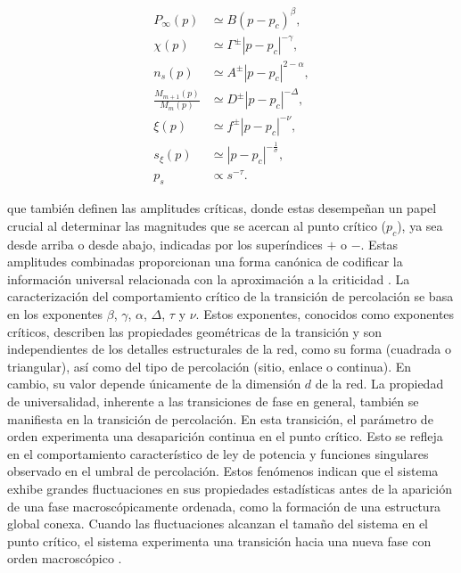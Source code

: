 \begin{align} 
	P_\infty(p) & \simeq B\left(p-p_c\right)^\beta, \label{eq:6a}\\ 
	\chi(p)  & \simeq \Gamma^{\pm}\left| p-p_c \right|^{-\gamma}, \label{eq:6b} \\
	n_s(p) & \simeq A^{\pm}  \left| p-p_c \right|^{2-\alpha}, \label{eq:6c} \\
	\frac{M_{m+1}(p)}{M_m(p)} &\simeq D^{\pm} \left| p-p_c \right|^{-\Delta}, \label{eq:6d}\\
	\xi(p) &\simeq f^{\pm}\left| p-p_c \right|^{-\nu}, \label{eq:6e} \\
	s_\xi(p) &\simeq \left| p-p_c \right|^{-\frac{1}{\sigma}}, \label{eq:6f}\\
	p_s &\propto s^{-\tau}.
	\end{align}
	
	
que también definen las amplitudes críticas, donde estas desempeñan un papel crucial al determinar las magnitudes que se acercan al punto crítico ($p_c$), ya sea desde arriba o desde abajo, indicadas por los superíndices $+$ o $-$. Estas amplitudes combinadas proporcionan una forma canónica de codificar la información universal relacionada con la aproximación a la criticidad \cite{aharony_universal_1980}. La caracterización del comportamiento crítico de la transición de percolación se basa en los exponentes  $\beta$, $\gamma$, $\alpha$, $\Delta$,  $\tau$ y $\nu$. Estos exponentes, conocidos como exponentes críticos, describen las propiedades geométricas de la transición y son independientes de los detalles estructurales de la red, como su forma (cuadrada o triangular), así como del tipo de percolación (sitio, enlace o continua). En cambio, su valor depende únicamente de la dimensión $d$ de la red.  La propiedad de universalidad, inherente a las transiciones de fase en general, también se manifiesta en la transición de percolación. En esta transición, el parámetro de orden experimenta una desaparición continua en el punto crítico. Esto se refleja en el comportamiento característico de ley de potencia y funciones singulares observado en el umbral de percolación. Estos fenómenos indican que el sistema exhibe grandes fluctuaciones en sus propiedades estadísticas antes de la aparición de una fase macroscópicamente ordenada, como la formación de una estructura global conexa. Cuando las fluctuaciones alcanzan el tamaño del sistema en el punto crítico, el sistema experimenta una transición hacia una nueva fase con orden macroscópico \cite{barrat_dynamical_2008}.


